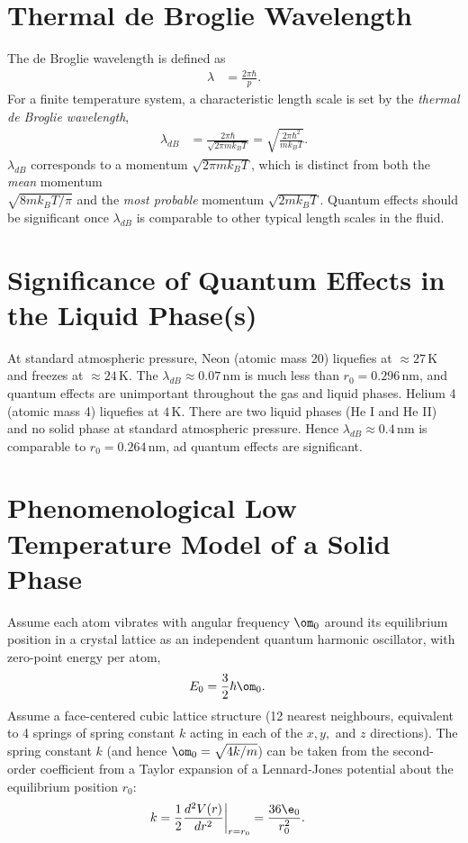 \documentclass[a4paper, 11pt, normalem]{report}
\begin{document}
\section{Thermal de Broglie Wavelength}
The de Broglie wavelength is defined as
\begin{align}
    \lambda &= \frac{2\pi\hbar}{p}.
\end{align}
For a finite temperature system, a characteristic length scale is set by the \emph{thermal de Broglie wavelength},
\begin{align}
    \lambda_{dB} &= \frac{2\pi\hbar}{\sqrt{2\pi mk_BT}} = \sqrt{\frac{2\pi\hbar^2}{mk_BT}}.
\end{align}
$\lambda_{dB}$ corresponds to a momentum $\sqrt{2\pi mk_BT}$, which is distinct from both the \emph{mean} momentum \\ $\sqrt{8mk_BT/\pi}$ and the \emph{most probable} momentum $\sqrt{2mk_BT}$.
Quantum effects should be significant once $\lambda_{dB}$ is comparable to other typical length scales in the fluid.

\section{Significance of Quantum Effects in the Liquid Phase(s)}
At standard atmospheric pressure, Neon (atomic mass 20) liquefies at $\approx27\,$K and freezes at $\approx24\,$K.
The $\lambda_{dB}\approx0.07\,$nm is much less than $r_0=0.296\,$nm, and quantum effects are unimportant throughout the gas and liquid phases.
Helium 4 (atomic mass 4) liquefies at $4\,$K.
There are two liquid phases (He I and He II) and no solid phase at standard atmospheric pressure.
Hence $\lambda_{dB}\approx0.4\,$nm is comparable to $r_0=0.264\,$nm, ad quantum effects are significant.

\section{Phenomenological Low Temperature Model of a Solid Phase}
Assume each atom vibrates with angular frequency $\om_0$ around its equilibrium position in a crystal lattice as an independent quantum harmonic oscillator, with zero-point energy per atom,
\begin{align}
    E_0 &= \frac32\hbar\om_0.
\end{align}
Assume a face-centered cubic lattice structure (12 nearest neighbours, equivalent to 4 springs of spring constant $k$ acting in each of the $x,y,$ and $z$ directions).
The spring constant $k$ (and hence $\om_0=\sqrt{4k/m}$) can be taken from the second-order coefficient from a Taylor expansion of a Lennard-Jones potential about the equilibrium position $r_0$:
\begin{align}
    k &= \frac12 \frac{d^2V(r)}{dr^2}\bigg|_{r=r_0} = \frac{36\e_0}{r^2_0}.
\end{align}
\end{document}
